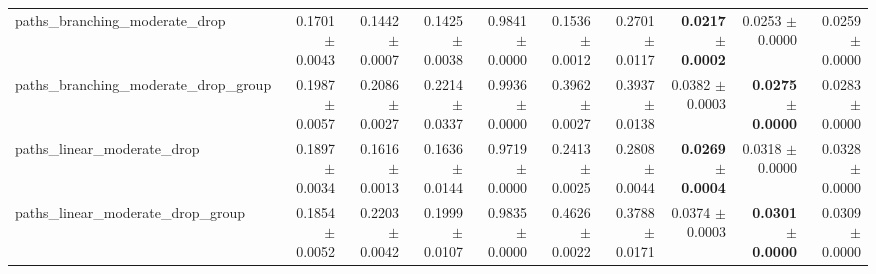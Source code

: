 \begin{tabular}{@{}lrrrrrrrrr@{}}
paths\_branching\_moderate\_drop & 0.1701 $\pm$ 0.0043 & 0.1442 $\pm$ 0.0007 & 0.1425 $\pm$ 0.0038 & 0.9841 $\pm$ 0.0000 & 0.1536 $\pm$ 0.0012 & 0.2701 $\pm$ 0.0117 & \textbf{0.0217 $\pm$ 0.0002} & 0.0253 $\pm$ 0.0000 & 0.0259 $\pm$ 0.0000 \\
paths\_branching\_moderate\_drop\_group & 0.1987 $\pm$ 0.0057 & 0.2086 $\pm$ 0.0027 & 0.2214 $\pm$ 0.0337 & 0.9936 $\pm$ 0.0000 & 0.3962 $\pm$ 0.0027 & 0.3937 $\pm$ 0.0138 & 0.0382 $\pm$ 0.0003 & \textbf{0.0275 $\pm$ 0.0000} & 0.0283 $\pm$ 0.0000 \\
paths\_linear\_moderate\_drop & 0.1897 $\pm$ 0.0034 & 0.1616 $\pm$ 0.0013 & 0.1636 $\pm$ 0.0144 & 0.9719 $\pm$ 0.0000 & 0.2413 $\pm$ 0.0025 & 0.2808 $\pm$ 0.0044 & \textbf{0.0269 $\pm$ 0.0004} & 0.0318 $\pm$ 0.0000 & 0.0328 $\pm$ 0.0000 \\
paths\_linear\_moderate\_drop\_group & 0.1854 $\pm$ 0.0052 & 0.2203 $\pm$ 0.0042 & 0.1999 $\pm$ 0.0107 & 0.9835 $\pm$ 0.0000 & 0.4626 $\pm$ 0.0022 & 0.3788 $\pm$ 0.0171 & 0.0374 $\pm$ 0.0003 & \textbf{0.0301 $\pm$ 0.0000} & 0.0309 $\pm$ 0.0000 \\
\bottomrule
\end{tabular}
